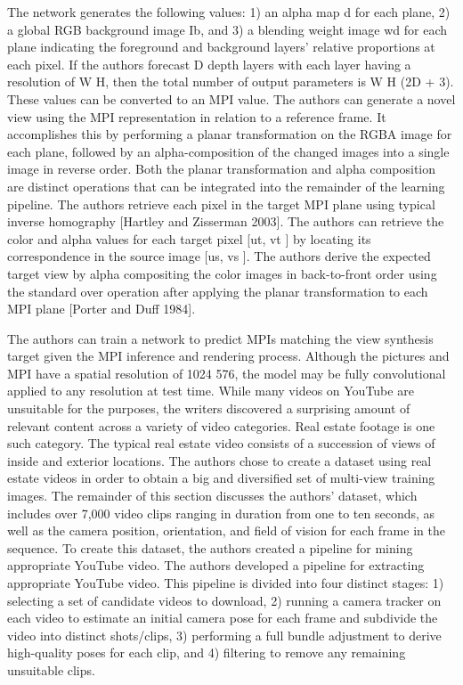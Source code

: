 The network generates the following values: 1) an alpha map d for each plane, 2) a global RGB background image Ib, and 3) a blending weight image wd for each plane indicating the foreground and background layers' relative proportions at each pixel. If the authors forecast D depth layers with each layer having a resolution of W H, then the total number of output parameters is W H (2D + 3).
These values can be converted to an MPI value. The authors can generate a novel view using the MPI representation in relation to a reference frame. It accomplishes this by performing a planar transformation on the RGBA image for each plane, followed by an alpha-composition of the changed images into a single image in reverse order. Both the planar transformation and alpha composition are distinct operations that can be integrated into the remainder of the learning pipeline. The authors retrieve each pixel in the target MPI plane using typical inverse homography [Hartley and Zisserman 2003]. The authors can retrieve the color and alpha values for each target pixel [ut, vt ] by locating its correspondence in the source image [us, vs ]. The authors derive the expected target view by alpha compositing the color images in back-to-front order using the standard over operation after applying the planar transformation to each MPI plane [Porter and Duff 1984].

The authors can train a network to predict MPIs matching the view synthesis target given the MPI inference and rendering process. Although the pictures and MPI have a spatial resolution of 1024 576, the model may be fully convolutional applied to any resolution at test time. While many videos on YouTube are unsuitable for the purposes, the writers discovered a surprising amount of relevant content across a variety of video categories. Real estate footage is one such category. The typical real estate video consists of a succession of views of inside and exterior locations. The authors chose to create a dataset using real estate videos in order to obtain a big and diversified set of multi-view training images. The remainder of this section discusses the authors' dataset, which includes over 7,000 video clips ranging in duration from one to ten seconds, as well as the camera position, orientation, and field of vision for each frame in the sequence. To create this dataset, the authors created a pipeline for mining appropriate YouTube video. The authors developed a pipeline for extracting appropriate YouTube video. This pipeline is divided into four distinct stages: 1) selecting a set of candidate videos to download, 2) running a camera tracker on each video to estimate an initial camera pose for each frame and subdivide the video into distinct shots/clips, 3) performing a full bundle adjustment to derive high-quality poses for each clip, and 4) filtering to remove any remaining unsuitable clips.

